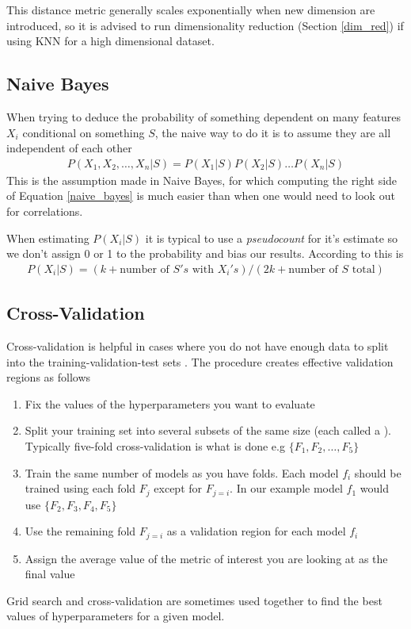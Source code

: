 This distance metric generally scales exponentially when new dimension are introduced, so it is advised to run dimensionality reduction (Section \ref{dim_red}) if using KNN for a high dimensional dataset.
\subsection{Naive Bayes}
When trying to deduce the probability of something dependent on many features $X_i$ conditional on something $S$, the naive way to do it is to assume they are all independent of each other
\begin{align}\label{naive_bayes}
	P(X_1,X_2,\dots,X_n|S) = P(X_1|S)P(X_2|S)\dots P(X_n|S)
\end{align}
This is the assumption made in Naive Bayes, for which computing the right side of Equation \ref{naive_bayes} is much easier than when one would need to look out for correlations.

When estimating $P(X_i|S)$ it is typical to use a \textit{pseudocount} for it's estimate so we don't assign 0 or 1 to the probability and bias our results. According to \cite{sutton} this is
\begin{align}
	P(X_i|S) = (k+\textrm{number~of~} S's\textrm{~with~} X_i's) / (2k+\textrm{number~of~} S \textrm{~total})
\end{align}

\subsection{Cross-Validation}
Cross-validation is helpful in cases where you do not have enough data to split into the training-validation-test sets \cite{burkov}. The procedure creates effective validation regions as follows

\begin{enumerate}
    \item Fix the values of the hyperparameters you want to evaluate
    \item Split your training set into several subsets of the same size (each called a ). Typically five-fold cross-validation is what is done e.g $\{F_1, F_2, \ldots, F_5\}$
    \item Train the same number of models as you have folds. Each model $f_i$ should be trained using each fold $F_j$ except for $F_{j=i}$. In our example model $f_1$ would use $\{F_2, F_3, F_4,F_5\}$
    \item Use the remaining fold $F_{j=i}$ as a validation region for each model $f_i$
    \item Assign the average value of the metric of interest you are looking at as the final value
\end{enumerate}
Grid search and cross-validation are sometimes used together to find the best values of hyperparameters for a given model.

